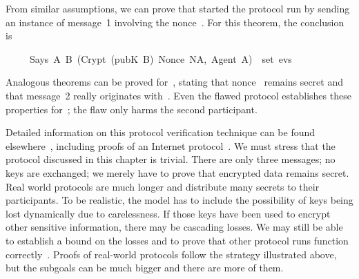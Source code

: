 From similar assumptions, we can prove that  started the protocol
run by sending an instance of message~1 involving the nonce~\@. 
For this theorem, the conclusion is 
\begin{isabelle}
\ \ \ \ \ Says\ A\ B\ (Crypt\ (pubK\ B)\ \isasymlbrace Nonce\ NA,\ Agent\
A\isasymrbrace )\ \isasymin \ set\ evs
\end{isabelle}
%
Analogous theorems can be proved for~, stating that nonce~
remains secret and that message~2 really originates with~\isa{B}.  Even the
flawed protocol establishes these properties for~\isa{A};
the flaw only harms the second participant.

\medskip

Detailed information on this protocol verification technique can be found
elsewhere~\cite{paulson-jcs}, including proofs of an Internet
protocol~\cite{paulson-tls}.  We must stress that the protocol discussed
in this chapter is trivial.  There are only three messages; no keys are
exchanged; we merely have to prove that encrypted data remains secret. 
Real world protocols are much longer and distribute many secrets to their
participants.  To be realistic, the model has to include the possibility
of keys being lost dynamically due to carelessness.  If those keys have
been used to encrypt other sensitive information, there may be cascading
losses.  We may still be able to establish a bound on the losses and to
prove that other protocol runs function
correctly~\cite{paulson-yahalom}.  Proofs of real-world protocols follow
the strategy illustrated above, but the subgoals can
be much bigger and there are more of them.

\endinput
